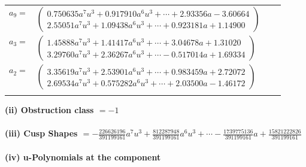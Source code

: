 \documentclass[1p]{elsarticle_modified}
\theoremstyle{definition}
\begin{document}
\begin{tabular}{m{7pt} m{180pt} m{7pt} m{180pt} }
\flushright $a_{9}=$&$\begin{pmatrix}0.750635 a^{7} u^{3}+0.917910 a^{6} u^{3}+\cdots+2.93356 a-3.60664\\2.55051 a^{7} u^{3}+1.09438 a^{6} u^{3}+\cdots+0.923181 a+1.14900\end{pmatrix}$ \\
\flushright $a_{3}=$&$\begin{pmatrix}1.45888 a^{7} u^{3}+1.41417 a^{6} u^{3}+\cdots+3.04678 a+1.31020\\3.29760 a^{7} u^{3}+2.36267 a^{6} u^{3}+\cdots-0.517014 a+1.69334\end{pmatrix}$ \\
\flushright $a_{2}=$&$\begin{pmatrix}3.35619 a^{7} u^{3}+2.53901 a^{6} u^{3}+\cdots+0.983459 a+2.72072\\2.69534 a^{7} u^{3}+0.575282 a^{6} u^{3}+\cdots+2.03500 a-1.46172\end{pmatrix}$\\&\end{tabular}
\flushleft \textbf{(ii) Obstruction class $= -1$}\\~\\
\flushleft \textbf{(iii) Cusp Shapes $= -\frac{226626196}{391199161} a^7 u^3+\frac{812287948}{391199161} a^6 u^3+\cdots-\frac{1739775136}{391199161} a+\frac{15821222826}{391199161}$}\\~\\
\newpage\renewcommand{\arraystretch}{1}
\flushleft \textbf{(iv) u-Polynomials at the component}\newline \\
\end{document}
